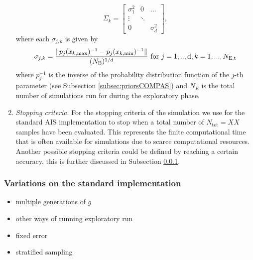 \documentclass[a4paper,fleqn,usenatbib]{mnras}
\begin{document}
\begin{enumerate}
%
\begin{equation}
\Sigma_k = \begin{bmatrix} 
    \sigma_{1}^2 & 0 & \dots \\
    \vdots & \ddots & \\
    0 &        & \sigma_{d}^2 
    \end{bmatrix}, 
	\label{eq:covariance-matrix}
\end{equation}
%
where each $\sigma_{j,k} $  is given by
%
\begin{equation}
	\sigma_{j,k} =  \frac{\|p_j(x_{k, \text{max}})^{-1} - p_j(x_{k, \text{min}})^{-1} \|}{(N_{\text{E}})^{1/d}} \\
	  \text{ for } j = 1,.. ,\text{d}, k = 1, ... , N_{\text{E,t}} 
	\label{eq:sigma-covariance-matrix}
\end{equation}
%
where $p_j^{-1}$ is the inverse of the probability distribution function of the $j$-th parameter (see Subsection \ref{subsec:priorsCOMPAS}) and $N_E$ is the total number of simulations run for during the exploratory phase. 

	\item  \emph{Stopping criteria}. For the stopping criteria of the simulation we use for the standard AIS implementation to stop when a total number of $N_{\text{tot}} = XX $ samples have been evaluated. This represents the finite computational time that is often available for simulations due to scarce computational resources. Another possible stopping criteria could be defined by reaching a certain accuracy, this is further discussed in Subsection \ref{subsec:var_standardAIS}. 
	
\end{enumerate}

%


\subsubsection{Variations on the standard implementation}
\label{subsec:var_standardAIS}
\begin{itemize}
	\item multiple generations of $g$
	\item other ways of running exploratory run 
	\item fixed error
	\item stratified sampling 
	
\end{itemize}
%
\end{document}
